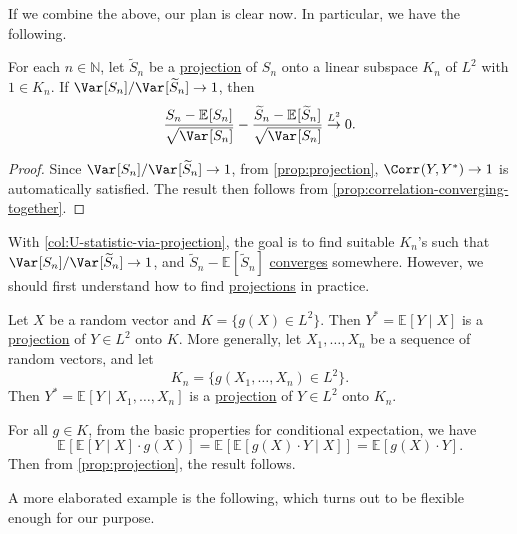 If we combine the above, our plan is clear now. In particular, we have the following.

\begin{corollary}\label{col:U-statistic-via-projection}
	For each \(n \in \mathbb{N} \), let \(\widetilde{S} _n\) be a \hyperref[def:projection]{projection} of \(S_n\) onto a linear subspace \(K_n\) of \(L^2\) with \(1 \in K_n\). If \(\Var_{}[S_n] / \Var_{}[\widetilde{S} _n] \to 1\), then
	\[
		\frac{S_n - \mathbb{E}_{}[S_n] }{\sqrt{\Var_{}[S_n] } } - \frac{\widetilde{S} _n - \mathbb{E}_{}[\widetilde{S} _n] }{\sqrt{\Var_{}[S_n] } }
		\overset{L^2}{\to} 0.
	\]
\end{corollary}
\begin{proof}
	Since \(\Var_{}[S_n] / \Var_{}[\widetilde{S} _n] \to 1\), from \autoref{prop:projection}, \(\Corr_{}(Y, Y^{\ast} ) \to 1\) is automatically satisfied. The result then follows from \autoref{prop:correlation-converging-together}.
\end{proof}

With \autoref{col:U-statistic-via-projection}, the goal is to find suitable \(K_n\)'s such that \(\Var_{}[S_n] / \Var_{}[\widetilde{S} _n] \to 1\), and \(\widetilde{S} _n - \mathbb{E}_{}[\widetilde{S} _n] \) \hyperref[def:converge-in-distribution]{converges} somewhere. However, we should first understand how to find \hyperref[def:projection]{projections} in practice.

\begin{eg}
	Let \(X\) be a random vector and \(K = \{g(X) \in L^2 \} \). Then \(Y^{\ast} = \mathbb{E}_{}[Y \mid X] \) is a \hyperref[def:projection]{projection} of \(Y \in L^2\) onto \(K\). More generally, let \(X_1, \dots , X_n\) be a sequence of random vectors, and let
	\[
		K_n = \{g(X_1, \dots , X_n) \in L^2\}.
	\]
	Then \(Y^{\ast} = \mathbb{E}_{}[Y \mid X_1, \dots , X_n] \) is a \hyperref[def:projection]{projection} of \(Y \in L^2\) onto \(K_n\).
\end{eg}
\begin{explanation}
	For all \(g \in K\), from the basic properties for conditional expectation, we have
	\[
		\mathbb{E}_{}[\mathbb{E}_{}[Y \mid X] \cdot g(X)]
		= \mathbb{E}_{}[\mathbb{E}_{}[g(X) \cdot Y \mid X] ]
		= \mathbb{E}_{}[g(X) \cdot Y].
	\]
	Then from \autoref{prop:projection}, the result follows.
\end{explanation}

A more elaborated example is the following, which turns out to be flexible enough for our purpose.

